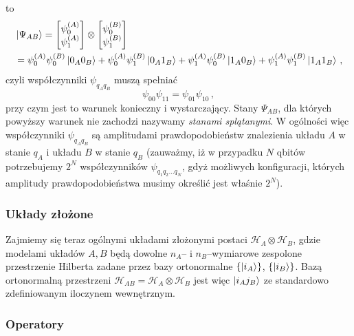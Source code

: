 \documentclass{myclass}
\begin{document}
\otimes {}\) to
\begin{equation*}
    \begin{split}
        &\ket{\Psi_{AB}} = \mqty[\psi_0^{(A)} \\ \psi_1^{(A)}]\otimes\mqty[\psi_0^{(B)} \\ \psi_1^{(B)}] \\
        &= \psi_0^{(A)}\psi_0^{(B)}\ket{0_A0_B} + \psi_0^{(A)}\psi_1^{(B)}\ket{0_A1_B} + \psi_1^{(A)}\psi_0^{(B)}\ket{1_A0_B} + \psi_1^{(A)}\psi_1^{(B)}\ket{1_A1_B}\,,
    \end{split}
\end{equation*}
czyli współczynniki \(\psi_{q_Aq_B}\) muszą spełniać
\begin{equation*}
    \psi_{00}\psi_{11} = \psi_{01}\psi_{10}\,,
\end{equation*}
przy czym jest to warunek konieczny i wystarczający. Stany \(\Psi_{AB}\), dla których powyższy
warunek nie zachodzi nazywamy \textit{stanami splątanymi}. W ogólności więc współczynniki
\(\psi_{q_Aq_B}\) są amplitudami prawdopodobieństw znalezienia układu \(A\) w stanie \(q_A\) i
układu \(B\) w stanie \(q_B\) (zauważmy, iż w przypadku \(N\) qbitów potrzebujemy \(2^N\)
współczynników \(\psi_{q_1q_2\ldots q_N}\), gdyż możliwych konfiguracji, których amplitudy
prawdopodobieństwa musimy określić jest właśnie \(2^N\)).

\subsubsection{Układy złożone}

Zajmiemy się teraz ogólnymi układami złożonymi postaci \(\mathscr{H}_A\otimes\mathscr{H}_B\), gdzie
modelami układów \(A, B\) będą dowolne \(n_A\)-- i \(n_B\)--wymiarowe zespolone przestrzenie
Hilberta zadane przez bazy ortonormalne \(\{\ket{i_A}\}\), \(\{\ket{i_B}\}\). Bazą ortonormalną
przestrzeni \(\mathscr{H}_{AB} = \mathscr{H}_A \otimes \mathscr{H}_B\) jest więc \(\ket{i_A j_B}\)
ze standardowo zdefiniowanym iloczynem wewnętrznym.

\subsubsection*{Operatory}
\end{document}
